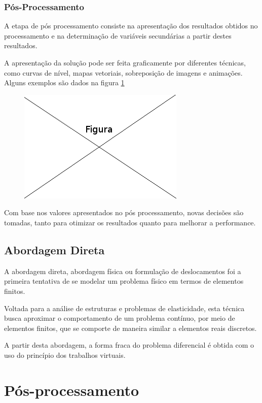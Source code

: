 \documentclass[
    12pt,               %
    openright,          %
    oneside,
    a4paper,            %
    english,            %
    french,             %
    spanish,            %
    brazil              %
    ]{abntex2}
\begin{document}
\subsubsection{Pós-Processamento}
A etapa de pós processamento consiste na apresentação dos resultados obtidos no processamento e na determinação de variáveis secundárias a partir destes resultados.

A apresentação da solução pode ser feita graficamente por diferentes técnicas, como curvas de nível, mapas vetoriais, sobreposição de imagens e animações. Alguns exemplos são dados na figura \ref{fig:graf}

\begin{figure}[!htb]
\centering
\includegraphics[scale=0.5]{figuras/temp.png}
\caption{}
\label{fig:graf}
\end{figure}

Com base nos valores apresentados no pós processamento, novas decisões são tomadas, tanto para otimizar os resultados quanto para melhorar a performance.

\subsection{Abordagem Direta \\}

A abordagem direta, abordagem física ou formulação de deslocamentos foi a primeira tentativa de se modelar um problema físico em termos de elementos finitos.

Voltada para a análise de estruturas e problemas de elasticidade, esta técnica busca aproximar o comportamento de um problema contínuo, por meio de elementos finitos, que se comporte de maneira similar a elementos reais discretos.
\cite[p. 19]{zien}

A partir desta abordagem, a forma fraca do problema diferencial é obtida com o uso do princípio dos trabalhos virtuais.
\cite[p. 20]{zien}

 
\section{Pós-processamento}
\label{sec:posProc}
\end{document}

